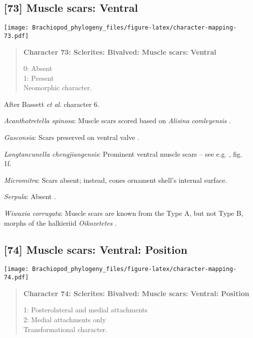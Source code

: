 \documentclass[openany]{book}
\theoremstyle{definition}
\theoremstyle{definition}
\theoremstyle{definition}
\theoremstyle{remark}
\begin{document}
\subsection*{{[}73{]} Muscle scars: Ventral}\label{muscle-scars-ventral}

\texttt{[image: Brachiopod\_phylogeny\_files/figure-latex/character-mapping-73.pdf]}

\begin{quote}
\textbf{Character 73: Sclerites: Bivalved: Muscle scars: Ventral }

0: Absent\\
1: Present\\
Neomorphic character.
\end{quote}

After Bassett \emph{et al}.
\citeyearpar{Bassett2001Functionalmorphology} character 6.

\hypertarget{Acanthotretella_spinosa-coding-73}{}
\emph{Acanthotretella spinosa}: Muscle scars scored based on
\emph{Alisina} \emph{comleyensis}
\citep{Bassett2001Functionalmorphology}.

\hypertarget{Gasconsia-coding-73}{}
\emph{Gasconsia}: Scars preserved on ventral valve \citep{Nikitin1984}.

\hypertarget{Longtancunella_chengjiangensis-coding-73}{}
\emph{Longtancunella chengjiangensis}: Prominent ventral muscle scars --
see e.g. \citet{Holmer2008TheEarly}, fig. 1f.

\hypertarget{Micromitra-coding-73}{}
\emph{Micromitra}: Scars absent; instead, cones ornament shell's
internal surface.

\hypertarget{Serpula-coding-73}{}
\emph{Serpula}: Absent \citep{Schwabe2010}.

\hypertarget{Wiwaxia_corrugata-coding-73}{}
\emph{Wiwaxia corrugata}: Muscle scars are known from the Type A, but
not Type B, morphs of the halkieriid \emph{Oikozetetes}
\citep{Paterson2009, Jacquet2014}.

\subsection*{{[}74{]} Muscle scars: Ventral:
Position}\label{muscle-scars-ventral-position}

\texttt{[image: Brachiopod\_phylogeny\_files/figure-latex/character-mapping-74.pdf]}

\begin{quote}
\textbf{Character 74: Sclerites: Bivalved: Muscle scars: Ventral:
Position}

1: Posterolateral and medial attachments\\
2: Medial attachments only\\
Transformational character.
\end{quote}
\end{document}

